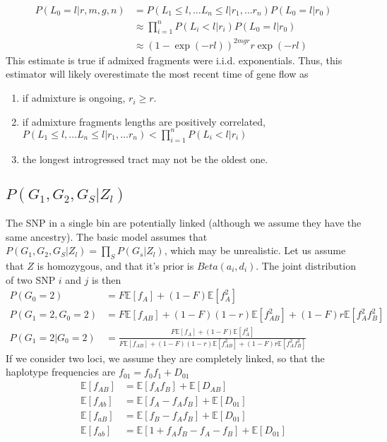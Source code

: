 \documentclass[10pt,a4paper]{article}
\newcommand{\BE}[1]{\mathbb{E}\left[#1\right]}
\begin{document}
\begin{align}
P(L_0=l | r, m, g, n) 
&= P(L_1 \leq l, \dots L_n \leq l | r_1, \dots r_n) P(L_0 = l | r_0)\nonumber\\
&\approx \prod_{i=1}^n P(L_i < l| r_i) P(L_0 = l | r_0)\nonumber\\
&\approx (1- \exp( -r l ))^{2m g r} r \exp ( -r l)
\end{align}
This estimate is true if admixed fragments were i.i.d. exponentials. Thus, this estimator will likely overestimate the most recent time of gene flow as
\begin{enumerate}
	\item if admixture is ongoing, $r_i \geq r$.
	\item if admixture fragments lengths are positively correlated, $P(L_1 \leq l, \dots L_n \leq l | r_1, \dots r_n) < \prod_{i=1}^n P(L_i < l| r_i)$
	\item the longest introgressed tract may not be the oldest one.
\end{enumerate}


\subsection{$P(G_1, G_2, G_S|Z_l)$}
The SNP in a single bin are potentially linked (although we assume they have the same ancestry).
The basic model assumes that 
$P(G_1, G_2, G_S|Z_l) = \prod_S P(G_s|Z_l)$, which may be unrealistic. Let us assume that $Z$ is homozygous, and that it's prior is $Beta(a_i,d_i)$. The joint distribution of two SNP $i$ and $j$ is then
\begin{align}
P(G_0=2) &= F \BE{f_A} + (1-F) \BE{f_A^2}\\
P(G_1=2,  G_0 = 2) &= F \BE{f_{AB}} + (1-F)(1-r) \BE{f_{AB}^2} + (1-F)r\BE{f_{A}^2f_{B}^2}\\
P(G_1=2 | G_0 = 2) &= \frac{F\BE{f_A} + (1-F) \BE{f_A^2}}{F \BE{f_{AB}} + (1-F)(1-r) \BE{f_{AB}^2} + (1-F)r\BE{f_{A}^2f_{B}^2}}
\end{align}
If we consider two loci, we assume they are completely linked, so that the haplotype frequencies are $f_{01} = f_0 f_1 + D_{01}$
\begin{align}
\BE{f_{AB}} &= \BE{f_A f_B} + \BE{D_{AB}}\\
\BE{f_{Ab}} &= \BE{f_A-f_Af_B} + \BE{D_{01}}\\
\BE{f_{aB}} &= \BE{f_B-f_Af_B} + \BE{D_{01}}\\
\BE{f_{ab}} &= \BE{1 + f_Af_B - f_A - f_B} + \BE{D_{01}}
\end{align}
\end{document}
